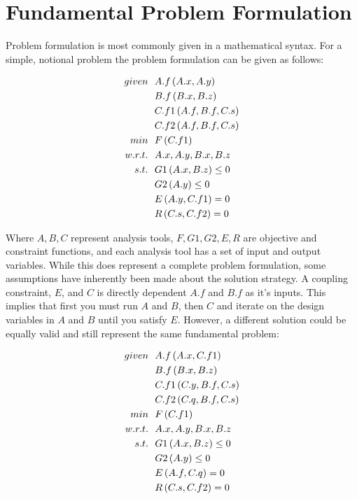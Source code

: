 \documentclass[]{aiaa-tc} %
\begin{document}
\section{Fundamental Problem Formulation}
    Problem formulation is most commonly given in a mathematical syntax. For a simple, notional problem the problem formulation
    can be given as follows:  

    \begin{align}
        given & \ \ A.f\left(A.x,A.y\right) \notag
        \\ & \ \  B.f\left(B.x,B.z\right) \notag
        \\ & \ \  C.f1\left(A.f,B.f,C.s\right) \notag
        \\ & \ \  C.f2\left(A.f,B.f,C.s\right) \notag
        \\min &\ \ F\left(C.f1\right) \notag
        \\ w.r.t. &\ \  A.x,A.y,B.x,B.z \notag
        \\ s.t. &\ \ G1\left(A.x,B.z\right) \leq 0 \notag
        \\      &\ \ G2\left(A.y\right) \leq 0 \notag
        \\      &\ \ E\left(A.y,C.f1\right) = 0 \notag
        \\      &\ \ R\left(C.s,C.f2\right) = 0 
        \label{eqn:simple}
    \end{align}

    Where $A,B,C$ represent analysis tools, $F,G1,G2,E,R$ are objective and constraint functions, and each analysis tool 
    has a set of input and output variables. While this does represent a complete problem formulation, some assumptions have
    inherently been made about the solution strategy. A coupling constraint, $E$, and $C$ is directly dependent
    $A.f$ and $B.f$ as it's inputs. This implies that first you must run $A$ and $B$, then $C$ and
    iterate on the design variables in $A$ and $B$ until you satisfy $E$. However, a different solution could be equally valid and still represent
    the same fundamental problem: 

    \begin{align}
        given & \ \ A.f\left(A.x,C.f1\right) \notag
        \\ & \ \  B.f\left(B.x,B.z\right) \notag
        \\ & \ \  C.f1\left(C.y,B.f,C.s\right) \notag
        \\ & \ \  C.f2\left(C.q,B.f,C.s\right) \notag
        \\min &\ \ F\left(C.f1\right) \notag
        \\ w.r.t. &\ \  A.x,A.y,B.x,B.z \notag
        \\ s.t. &\ \ G1\left(A.x,B.z\right) \leq 0 \notag
        \\      &\ \ G2\left(A.y\right) \leq 0 \notag
        \\      &\ \ E\left(A.f,C.q\right) = 0 \notag
        \\      &\ \ R\left(C.s,C.f2\right) = 0 
        \label{eqn:simple_2}
    \end{align}
\end{document}
